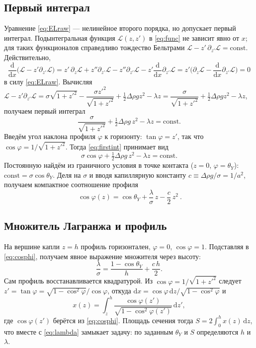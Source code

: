 \documentclass[11pt]{article}
\newcommand{\rd}{\mathrm{d}}
\newcommand{\thY}{\theta_{Y}}
\newcommand{\dd}[2]{\frac{\rd #1}{\rd #2}}
\theoremstyle{definition}
\begin{document}
\subsection{Первый интеграл}
Уравнение \eqref{eq:ELraw} --- нелинейное второго порядка, но допускает первый
интеграл. Подынтегральная функция $\mathcal{L}(z,z')$ в \eqref{eq:func} не зависит
явно от $x$; для таких функционалов справедливо тождество Бельтрами
$\mathcal{L}-z'\,\partial_{z'}\mathcal{L}=\mathrm{const}$. Действительно,
\[
\dd{}{x}\!\big(\mathcal{L}-z'\partial_{z'}\mathcal{L}\big)
=z'\,\partial_z\mathcal{L}+z''\partial_{z'}\mathcal{L}
-z''\partial_{z'}\mathcal{L}-z'\dd{}{x}\partial_{z'}\mathcal{L}
=z'\Big(\partial_z\mathcal{L}-\dd{}{x}\partial_{z'}\mathcal{L}\Big)=0
\]
в силу \eqref{eq:ELraw}. Вычисляя
$\mathcal{L}-z'\partial_{z'}\mathcal{L}
=\sigma\sqrt{1+z'^2}-\dfrac{\sigma z'^2}{\sqrt{1+z'^2}}+\tfrac12\Delta\rho g z^2-\lambda z
=\dfrac{\sigma}{\sqrt{1+z'^2}}+\tfrac12\Delta\rho g z^2-\lambda z$,
получаем первый интеграл
\begin{equation}
\frac{\sigma}{\sqrt{1+z'^{2}}}+\tfrac12\Delta\rho g\,z^{2}-\lambda z=\mathrm{const}.
\label{eq:firstint}
\end{equation}
Введём угол наклона профиля $\varphi$ к горизонту: $\tan\varphi=z'$, так что
$\cos\varphi=1/\sqrt{1+z'^{2}}$. Тогда \eqref{eq:firstint} принимает вид
\begin{equation}
\sigma\cos\varphi+\tfrac12\Delta\rho g\,z^{2}-\lambda z=\mathrm{const}.
\label{eq:firstint2}
\end{equation}
Постоянную найдём из граничного условия в точке контакта ($z=0$, $\varphi=\thY$):
$\mathrm{const}=\sigma\cos\thY$. Деля на $\sigma$ и вводя капиллярную константу
$c\equiv\Delta\rho g/\sigma=1/a^{2}$, получаем компактное соотношение профиля
\begin{equation}
\boxed{\ \cos\varphi(z)=\cos\thY+\frac{\lambda}{\sigma}\,z-\frac{c}{2}\,z^{2}\ }.
\label{eq:cosphi}
\end{equation}

\subsection{Множитель Лагранжа и профиль}
На вершине капли $z=h$ профиль горизонтален, $\varphi=0$, $\cos\varphi=1$.
Подставляя в \eqref{eq:cosphi}, получаем явное выражение множителя через высоту:
\begin{equation}
\frac{\lambda}{\sigma}=\frac{1-\cos\thY}{h}+\frac{c\,h}{2}.
\label{eq:lambda}
\end{equation}
Сам профиль восстанавливается квадратурой. Из $\cos\varphi=1/\sqrt{1+z'^2}$ следует
$z'=\tan\varphi=\sqrt{1-\cos^2\varphi}/\cos\varphi$, откуда
$\rd x=\cos\varphi\,\rd z/\sqrt{1-\cos^2\varphi}$ и
\begin{equation}
x(z)=\int_{z}^{h}\frac{\cos\varphi(z')}{\sqrt{1-\cos^{2}\varphi(z')}}\,\rd z',
\label{eq:xofz}
\end{equation}
где $\cos\varphi(z')$ берётся из \eqref{eq:cosphi}. Площадь сечения тогда
$S=2\int_0^h x(z)\,\rd z$, что вместе с \eqref{eq:lambda} замыкает задачу: по
заданным $\thY$ и $S$ определяются $h$ и $\lambda$.
\end{document}
